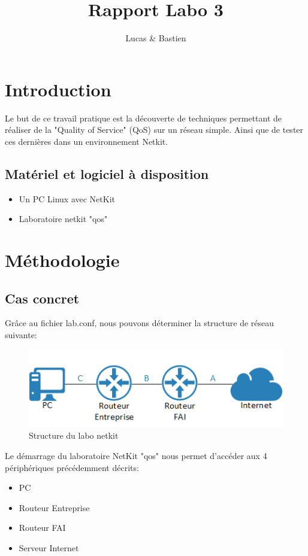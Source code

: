 \documentclass{article}
\title{Rapport Labo 3}
\author{\bsc{Bulloni} Lucas \& \bsc{Wermeille} Bastien}
\begin{document}
\maketitle

\section{Introduction}
Le but de ce travail pratique est la découverte de techniques permettant de réaliser de la "Quality of Service" (QoS) sur un réseau simple. Ainsi que de tester ces dernières dans un environnement Netkit.

\subsection{Matériel et logiciel à disposition}
\begin{itemize}
	\item Un PC Linux avec NetKit
	\item Laboratoire netkit "qos"
\end{itemize}

\section{Méthodologie}

\subsection{Cas concret}
Grâce au fichier lab.conf, nous pouvons déterminer la structure de réseau suivante:
\begin{figure}[h]
  \centering
  \includegraphics{./Structure.png}
  \caption{Structure du labo netkit}
  \label{fig:structure}
\end{figure}

Le démarrage du laboratoire NetKit "qos" nous permet d'accéder aux 4 périphériques précédemment décrits:
\begin{itemize}
	\item PC
	\item Routeur Entreprise
	\item Routeur FAI
	\item Serveur Internet
\end{itemize}
\end{document}

